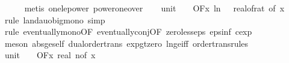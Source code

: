\begin{isabellebody}
\ \ \ \ \isamarkupfalse%
\ {\isacharparenleft}{\kern0pt}metis\ one{\isacharunderscore}{\kern0pt}le{\isacharunderscore}{\kern0pt}power\ power{\isacharunderscore}{\kern0pt}one{\isacharunderscore}{\kern0pt}over{\isacharparenright}{\kern0pt}\isanewline
\isanewline
\ \ \isamarkupfalse%
\ unit{\isacharunderscore}{\kern0pt}{}{\isacharcolon}{\kern0pt}\ {\isachardoublequoteopen}{\isacharparenleft}{\kern0pt}{\isasymlambda}{\isacharunderscore}{\kern0pt}{\isachardot}{\kern0pt}\ {}{\isacharparenright}{\kern0pt}\ {\isasymin}\ O{\isacharbrackleft}{\kern0pt}{\isacharquery}{\kern0pt}F{\isacharbrackright}{\kern0pt}{\isacharparenleft}{\kern0pt}{\isasymlambda}x{\isachardot}{\kern0pt}\ ln\ {\isacharparenleft}{\kern0pt}{}\ {\isacharslash}{\kern0pt}\ real{\isacharunderscore}{\kern0pt}of{\isacharunderscore}{\kern0pt}rat\ {\isacharparenleft}{\kern0pt}{\isasymepsilon}{\isacharunderscore}{\kern0pt}of\ x{\isacharparenright}{\kern0pt}{\isacharparenright}{\kern0pt}{\isacharparenright}{\kern0pt}{\isachardoublequoteclose}\isanewline
\ \ \ \ \isamarkupfalse%
\ {\isacharparenleft}{\kern0pt}rule\ landau{\isacharunderscore}{\kern0pt}o{\isachardot}{\kern0pt}big{\isacharunderscore}{\kern0pt}mono{\isacharcomma}{\kern0pt}\ simp{\isacharparenright}{\kern0pt}\isanewline
\ \ \ \ \isamarkupfalse%
\ {\isacharparenleft}{\kern0pt}rule\ eventually{\isacharunderscore}{\kern0pt}mono{\isacharbrackleft}{\kern0pt}OF\ eventually{\isacharunderscore}{\kern0pt}conj{\isacharbrackleft}{\kern0pt}OF\ zero{\isacharunderscore}{\kern0pt}less{\isacharunderscore}{\kern0pt}eps\ eps{\isacharunderscore}{\kern0pt}inf{\isacharbrackleft}{\kern0pt}\ c{\isacharequal}{\kern0pt}{\isachardoublequoteopen}exp\ {}{\isachardoublequoteclose}{\isacharbrackright}{\kern0pt}{\isacharbrackright}{\kern0pt}{\isacharbrackright}{\kern0pt}{\isacharparenright}{\kern0pt}\isanewline
\ \ \ \ \isamarkupfalse%
\ {\isacharparenleft}{\kern0pt}meson\ abs{\isacharunderscore}{\kern0pt}ge{\isacharunderscore}{\kern0pt}self\ dual{\isacharunderscore}{\kern0pt}order{\isachardot}{\kern0pt}trans\ exp{\isacharunderscore}{\kern0pt}gt{\isacharunderscore}{\kern0pt}zero\ ln{\isacharunderscore}{\kern0pt}ge{\isacharunderscore}{\kern0pt}iff\ order{\isacharunderscore}{\kern0pt}trans{\isacharunderscore}{\kern0pt}rules{\isacharparenleft}{\kern0pt}{}{}{\isacharparenright}{\kern0pt}{\isacharparenright}{\kern0pt}\isanewline
\isanewline
\ \ \isamarkupfalse%
\ unit{\isacharunderscore}{\kern0pt}{}{\isacharcolon}{\kern0pt}\ {\isachardoublequoteopen}{\isacharparenleft}{\kern0pt}{\isasymlambda}{\isacharunderscore}{\kern0pt}{\isachardot}{\kern0pt}\ {}{\isacharparenright}{\kern0pt}\ {\isasymin}\ O{\isacharbrackleft}{\kern0pt}{\isacharquery}{\kern0pt}F{\isacharbrackright}{\kern0pt}{\isacharparenleft}{\kern0pt}{\isasymlambda}x{\isachardot}{\kern0pt}\ real\ {\isacharparenleft}{\kern0pt}n{\isacharunderscore}{\kern0pt}of\ x{\isacharparenright}{\kern0pt}{\isacharparenright}{\kern0pt}{\isachardoublequoteclose}\isanewline

\end{isabellebody}

